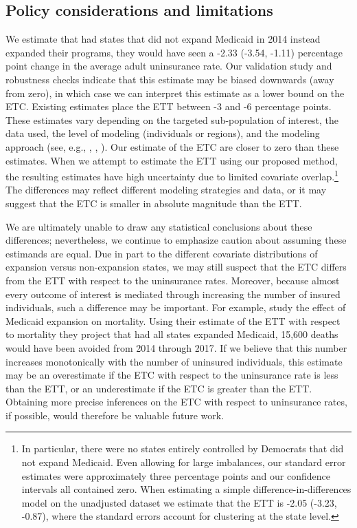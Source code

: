 \documentclass[aoas]{imsart}
\theoremstyle{plain}
\theoremstyle{remark}
\begin{document}
\subsection{Policy considerations and limitations}

We estimate that had states that did not expand Medicaid in 2014 instead expanded their programs, they would have seen a -2.33 (-3.54, -1.11) percentage point change in the average adult uninsurance rate. Our validation study and robustness checks indicate that this estimate may be biased downwards (away from zero), in which case we can interpret this estimate as a lower bound on the ETC. Existing estimates place the ETT between -3 and -6 percentage points. These estimates vary depending on the targeted sub-population of interest, the data used, the level of modeling (individuals or regions), and the modeling approach (see, e.g., \cite{courtemanche2017early}, \cite{kaestner2017effects}, \cite{frean2017premium}). Our estimate of the ETC are closer to zero than these estimates. When we attempt to estimate the ETT using our proposed method, the resulting estimates have high uncertainty due to limited covariate overlap.\footnote{In particular, there were no states entirely controlled by Democrats that did not expand Medicaid. Even allowing for large imbalances, our standard error estimates were approximately three percentage points and our confidence intervals all contained zero. When estimating a simple difference-in-differences model on the unadjusted dataset we estimate that the ETT is -2.05 (-3.23, -0.87), where the standard errors account for clustering at the state level.\label{footnote_did}} The differences may reflect different modeling strategies and data, or it may suggest that the ETC is smaller in absolute magnitude than the ETT.

We are ultimately unable to draw any statistical conclusions about these differences; nevertheless, we continue to emphasize caution about assuming these estimands are equal. Due in part to the different covariate distributions of expansion versus non-expansion states, we may still suspect that the ETC differs from the ETT with respect to the uninsurance rates. Moreover, because almost every outcome of interest is mediated through increasing the number of insured individuals, such a difference may be important. For example, \cite{miller2021medicaid} study the effect of Medicaid expansion on mortality. Using their estimate of the ETT with respect to mortality they project that had all states expanded Medicaid, 15,600 deaths would have been avoided from 2014 through 2017. If we believe that this number increases monotonically with the number of uninsured individuals, this estimate may be an overestimate if the ETC with respect to the uninsurance rate is less than the ETT, or an underestimate if the ETC is greater than the ETT. Obtaining more precise inferences on the ETC with respect to uninsurance rates, if possible, would therefore be valuable future work.
\end{document}
